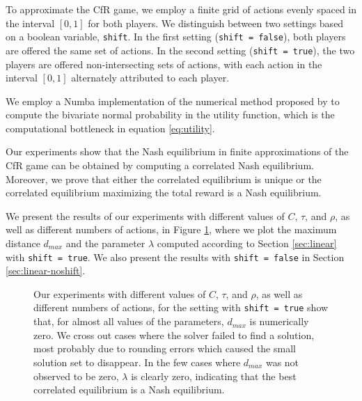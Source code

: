 \documentclass[preprint,12pt,authoryear]{elsarticle}
\theoremstyle{definition}
\begin{document}
To approximate the CfR game, we employ a finite grid of actions evenly spaced in the interval $[0, 1]$ for both players. We distinguish between two settings based on a boolean variable, \texttt{shift}. In the first setting (\texttt{shift = false}), both players are offered the same set of actions. In the second setting (\texttt{shift = true}), the two players are offered non-intersecting sets of actions, with each action in the interval $[0, 1]$ alternately attributed to each player.

We employ a Numba \citep{lam2015numba}  implementation of the numerical method proposed by \citet{genz2004numerical} to compute the bivariate normal probability in the utility function, which is the computational bottleneck in equation \ref{eq:utility}.

Our experiments show that the Nash equilibrium in finite approximations of the CfR game can be obtained by computing a correlated Nash equilibrium. Moreover, we prove that either the correlated equilibrium is unique or the correlated equilibrium maximizing the total reward is a Nash equilibrium.

We present the results of our experiments with different values of $C$, $\tau$, and $\rho$, as well as different numbers of actions, in Figure \ref{fig:linear-shift}, where we plot the maximum distance $d_{max}$ and the parameter $\lambda$ computed according to Section \ref{sec:linear} with \texttt{shift = true}. We also present the results with \texttt{shift = false} in Section \ref{sec:linear-noshift}.

\begin{figure}[htbp]
  \centering
  \begin{minipage}[t]{0.48\textwidth}
    \centering
    
  \end{minipage}
  \hfill
  \begin{minipage}[t]{0.48\textwidth}
    \centering
    
  \end{minipage}
  \caption{Our experiments with different values of $C$, $\tau$, and $\rho$, as well as different numbers of actions, for the setting with \texttt{shift = true} show that, for almost all values of the parameters, $d_{max}$ is numerically zero. We cross out cases where the solver failed to find a solution, most probably due to rounding errors which caused the small solution set to disappear. In the few cases where $d_{max}$ was not observed to be zero, $\lambda$ is clearly zero, indicating that the best correlated equilibrium is a Nash equilibrium.}
  \label{fig:linear-shift}  
\end{figure}
\end{document}
